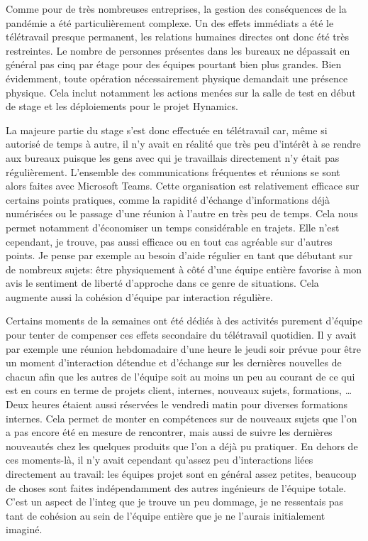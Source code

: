 \documentclass[12pt, oneside, a4paper, titlepage]{report}
\begin{document}
Comme pour de très nombreuses entreprises, la gestion des conséquences de la
pandémie a été particulièrement complexe. Un des effets immédiats a été le
télétravail presque permanent, les relations humaines directes ont donc été très
restreintes. Le nombre de personnes présentes dans les bureaux ne dépassait en
général pas cinq par étage pour des équipes pourtant bien plus grandes. Bien
évidemment, toute opération nécessairement physique demandait une présence
physique. Cela inclut notamment les actions menées sur la salle de test en début
de stage et les déploiements pour le projet Hynamics.

La majeure partie du stage s'est donc effectuée en télétravail car, même si
autorisé de temps à autre, il n'y avait en réalité que très peu d'intérêt à se
rendre aux bureaux puisque les gens avec qui je travaillais directement n'y
était pas régulièrement. L'ensemble des communications fréquentes et réunions se
sont alors faites avec Microsoft Teams. Cette organisation est relativement
efficace sur certains points pratiques, comme la rapidité d'échange
d'informations déjà numérisées ou le passage d'une réunion à l'autre en très peu
de temps. Cela nous permet notamment d'économiser un temps considérable en
trajets. Elle n'est cependant, je trouve, pas aussi efficace ou en tout cas
agréable sur d'autres points. Je pense par exemple au besoin d'aide régulier en
tant que débutant sur de nombreux sujets: être physiquement à côté d'une équipe
entière favorise à mon avis le sentiment de liberté d'approche dans ce genre de
situations. Cela augmente aussi la cohésion d'équipe par interaction régulière.

Certains moments de la semaines ont été dédiés à des activités purement d'équipe
pour tenter de compenser ces effets secondaire du télétravail quotidien. Il y
avait par exemple une réunion hebdomadaire d'une heure le jeudi soir prévue pour
être un moment d'interaction détendue et d'échange sur les dernières nouvelles
de chacun afin que les autres de l'équipe soit au moins un peu au courant de ce
qui est en cours en terme de projets client, internes, nouveaux sujets,
formations, \ldots{} Deux heures étaient aussi réservées le vendredi matin pour
diverses formations internes. Cela permet de monter en compétences sur de
nouveaux sujets que l'on a pas encore été en mesure de rencontrer, mais aussi de
suivre les dernières nouveautés chez les quelques produits que l'on a déjà pu
pratiquer. En dehors de ces moments-là, il n'y avait cependant qu'assez peu
d'interactions liées directement au travail: les équipes projet sont en général
assez petites, beaucoup de choses sont faites indépendamment des autres
ingénieurs de l'équipe totale. C'est un aspect de l'\gls{integ} que je trouve un
peu dommage, je ne ressentais pas tant de cohésion au sein de l'équipe entière
que je ne l'aurais initialement imaginé.
\end{document}
